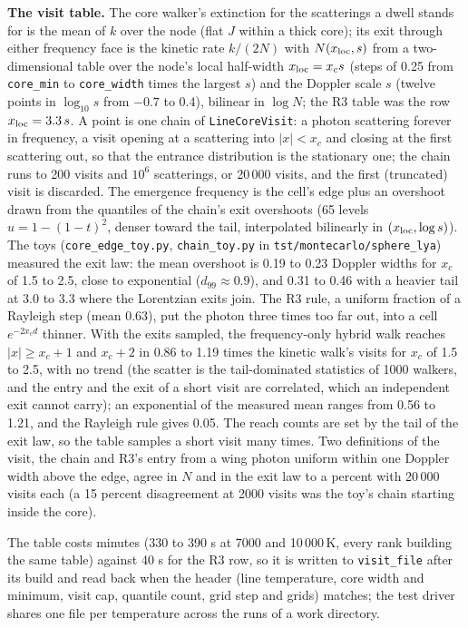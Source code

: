 \documentclass[11pt]{article}
\newcommand{\key}[1]{\texttt{#1}}
\begin{document}
\textbf{The visit table.}  The core walker's extinction for the scatterings a dwell
stands for is the mean of $k$ over the node (flat $J$ within a thick core); its exit
through either frequency face is the kinetic rate $k/(2N)$ with $N(x_{\rm loc}, s)$ from
a two-dimensional table over the node's local half-width $x_{\rm loc} = x_c s$ (steps of
0.25 from \key{core\_min} to \key{core\_width} times the largest $s$) and the Doppler
scale $s$ (twelve points in $\log_{10} s$ from $-0.7$ to 0.4), bilinear in $\log N$; the
R3 table was the row $x_{\rm loc} = 3.3\,s$.  A point is one chain of
\texttt{LineCoreVisit}: a photon scattering forever in frequency, a visit opening at a
scattering into $|x| < x_c$ and closing at the first scattering out, so that the entrance
distribution is the stationary one; the chain runs to 200 visits and $10^6$ scatterings,
or 20\,000 visits, and the first (truncated) visit is discarded.  The emergence frequency
is the cell's edge plus an overshoot drawn from the quantiles of the chain's exit
overshoots (65 levels $u = 1 - (1 - t)^2$, denser toward the tail, interpolated
bilinearly in $(x_{\rm loc}, \log s)$).  The toys (\texttt{core\_edge\_toy.py},
\texttt{chain\_toy.py} in \texttt{tst/montecarlo/sphere\_lya}) measured the exit law:
the mean overshoot is 0.19 to 0.23 Doppler widths for $x_c$ of 1.5 to 2.5, close to
exponential ($d_{99} \approx 0.9$), and 0.31 to 0.46 with a heavier tail at 3.0 to 3.3
where the Lorentzian exits join.  The R3 rule, a uniform fraction of a Rayleigh step
(mean 0.63), put the photon three times too far out, into a cell $e^{-2 x_c d}$ thinner.
With the exits sampled, the frequency-only hybrid walk reaches $|x| \ge x_c + 1$ and
$x_c + 2$ in 0.86 to 1.19 times the kinetic walk's visits for $x_c$ of 1.5 to 2.5, with
no trend (the scatter is the tail-dominated statistics of 1000 walkers, and the entry
and the exit of a short visit are correlated, which an independent exit cannot carry);
an exponential of the measured mean ranges from 0.56 to 1.21, and the Rayleigh rule
gives 0.05.  The reach counts are set by the tail of the exit law, so the table samples
a short visit many times.  Two definitions of the visit, the chain and R3's entry from a wing photon
uniform within one Doppler width above the edge, agree in $N$ and in the exit law to a
percent with 20\,000 visits each (a 15 percent disagreement at 2000 visits was the
toy's chain starting inside the core).

The table costs minutes (330 to 390 s at 7000 and 10\,000\,K, every rank building the
same table) against 40 s for the R3 row, so it is written to \key{visit\_file} after
its build and read back when the header (line temperature, core width and minimum,
visit cap, quantile count, grid step and grids) matches; the test driver shares one
file per temperature across the runs of a work directory.
\end{document}
